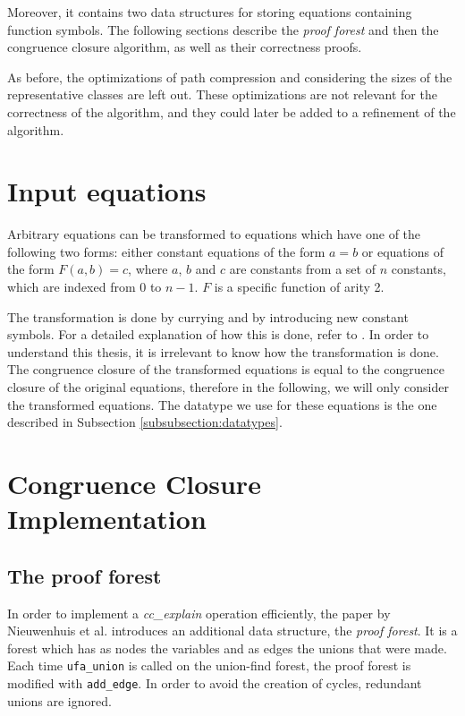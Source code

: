 Moreover, it contains two data structures for storing equations containing function symbols. The following sections describe the \emph{proof forest} and then the congruence closure algorithm, as well as their correctness proofs.

As before, the optimizations of path compression and considering the sizes of the representative classes are left out. These optimizations are not relevant for the correctness of the algorithm, and they could later be added to a refinement of the algorithm.

\section{Input equations}\label{section:inputequations}

Arbitrary equations can be transformed to equations which have one of the following two forms: either constant equations of the form $a = b$ or equations of the form $F(a,b) = c$, where $a$, $b$ and $c$ are constants from a set of $n$ constants, which are indexed from $0$ to $n-1$. $F$ is a specific function of arity 2.

The transformation is done by currying and by introducing new constant symbols. For a detailed explanation of how this is done, refer to \cite{Nieuwenhuis2}. In order to understand this thesis, it is irrelevant to know how the transformation is done.
The congruence closure of the transformed equations is equal to the congruence closure of the original equations, therefore in the following, we will only consider the transformed equations.
The datatype we use for these equations is the one described in Subsection \ref{subsubsection:datatypes}.

\section{Congruence Closure Implementation}

\subsection{The proof forest}

In order to implement a \emph{cc\_explain} operation efficiently, the paper by Nieuwenhuis et al. \cite{Nieuwenhuis} introduces an additional data structure, the \emph{proof forest}. It is a forest which has as nodes the variables and as edges the unions that were made. Each time \lstinline|ufa_union| is called on the union-find forest, the proof forest is modified with \lstinline|add_edge|. In order to avoid the creation of cycles, redundant unions are ignored.

